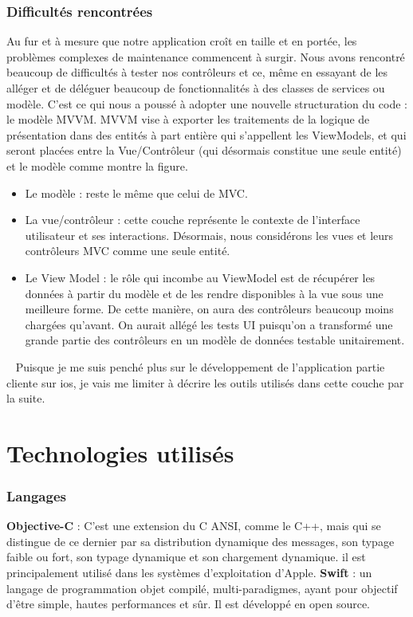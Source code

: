  \subsubsection{Difficultés rencontrées} %
 \label{ssub:difficultés_rencontrées_et_pourquoi_mvvm_}
 Au fur et à mesure que notre application croît en taille et en portée, les problèmes complexes de maintenance commencent à surgir. Nous avons rencontré beaucoup de difficultés à tester nos contrôleurs et ce, même en essayant de les alléger et de déléguer beaucoup de fonctionnalités à des classes de services ou modèle. C'est ce qui nous a poussé à adopter une nouvelle structuration du code : le modèle MVVM.\cite{mvvm}\newline
 MVVM vise à exporter les traitements de la logique de présentation dans des entités à part entière qui s'appellent les ViewModels, et qui seront placées entre la Vue/Contrôleur (qui désormais constitue une seule entité) et le modèle comme montre la figure.
 \begin{itemize}
 	\item Le modèle : reste le même que celui de MVC.
 	\item La vue/contrôleur : cette couche représente le contexte de l'interface utilisateur et ses interactions. Désormais, nous considérons les vues et leurs contrôleurs MVC comme une seule entité.
 	\item Le View Model : le rôle qui incombe au ViewModel est de récupérer les données à partir du modèle et de les rendre disponibles à la vue sous une meilleure forme. De cette manière, on aura des contrôleurs beaucoup moins chargées qu'avant. On aurait allégé les tests UI puisqu'on a transformé une grande partie des contrôleurs en un modèle de données testable unitairement. 
 \end{itemize}\
 Puisque je me suis penché plus sur le développement de l'application partie cliente sur ios, je vais me limiter à décrire les outils utilisés dans cette couche par la suite.

\section{Technologies utilisés} %
\label{sec:technologies_et_outils_utilisés}
\subsubsection{Langages} %
\label{ssub:lanages}
\begin{itemize}
	\itemb \textbf{Objective-C} : C'est une extension du C ANSI, comme le C++, mais qui se distingue de ce dernier par sa distribution dynamique des messages, son typage faible ou fort, son typage dynamique et son chargement dynamique. il est principalement utilisé dans les systèmes d'exploitation d'Apple.
	\itemb \textbf{Swift} : un langage de programmation objet compilé, multi-paradigmes, ayant pour objectif d'être simple, hautes performances et sûr. Il est développé en open source.
\end{itemize}

